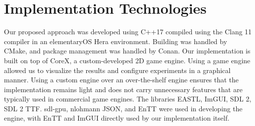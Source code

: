 
\section{Implementation Technologies}
Our proposed approach was developed using C++17 compiled using the Clang 11 compiler in an elementaryOS Hera environment. Building was handled by CMake, and package management was handled by Conan. Our implementation is built on top of CoreX, a custom-developed 2D game engine. Using a game engine allowed us to visualize the results and configure experiments in a graphical manner. Using a custom engine over an over-the-shelf engine ensures that the implementation remains light and does not carry unnecessary features that are typically used in commercial game engines. The libraries EASTL, ImGUI, SDL 2, SDL 2 TTF. sdl-gpu, nlohmann JSON, and EnTT were used in developing the engine, with EnTT and ImGUI directly used by our implementation itself.